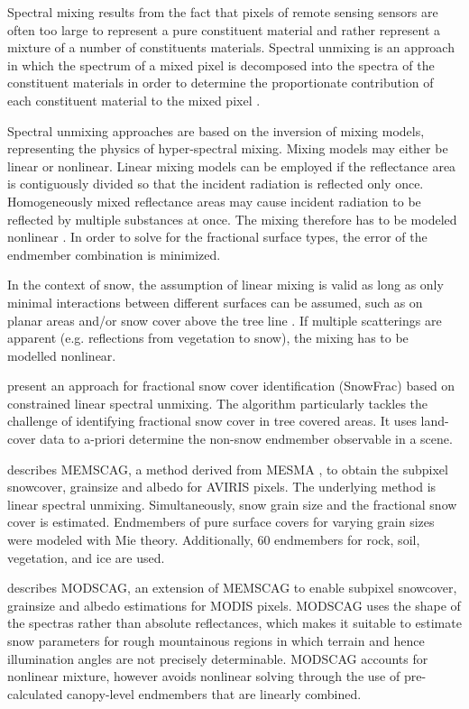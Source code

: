 \documentclass[a4paper,10pt]{article}
\begin{document}
Spectral mixing results from the fact that pixels of remote sensing sensors are often too large to represent a pure constituent material and rather represent a mixture of a number of constituents materials. Spectral unmixing is an approach in which the spectrum of a mixed pixel is decomposed into the spectra of the constituent materials in order to determine the proportionate contribution of each constituent material to the mixed pixel \citep{Keshava2003}.

Spectral unmixing approaches are based on the inversion of mixing models, representing the physics of hyper-spectral mixing. Mixing models may either be linear or nonlinear. Linear mixing models can be employed if the reflectance area is contiguously divided so that the incident radiation is reflected only once. Homogeneously mixed reflectance areas may cause incident radiation to be reflected by multiple substances at once. The mixing therefore has to be modeled nonlinear \citep{Keshava2003}.
In order to solve for the fractional surface types, the error of the endmember combination is minimized.

In the context of snow, the assumption of linear mixing is valid as long as only minimal interactions between different surfaces can be assumed, such as on planar areas and/or snow cover above the tree line \citep{Painter2009}. If multiple scatterings are apparent (e.g. reflections from vegetation to snow), the mixing has to be modelled nonlinear.

\cite{Vikhamar2003} present an approach for fractional snow cover identification (SnowFrac) based on constrained linear spectral unmixing. The algorithm particularly tackles the challenge of identifying fractional snow cover in tree covered areas. It uses land-cover data to a-priori determine the non-snow endmember observable in a scene.

\citep{Painter2003} describes \gls{MEMSCAG}, a method derived from \gls{MESMA} \citep{Roberts1998}, to obtain the subpixel snowcover, grainsize and albedo for \gls{AVIRIS} pixels. The underlying method is linear spectral unmixing. Simultaneously, snow grain size and the fractional snow cover is estimated. Endmembers of pure surface covers for varying grain sizes were modeled with Mie theory. Additionally, 60 endmembers for rock, soil, vegetation, and ice are used.

\Cite{Painter2009} describes \gls{MODSCAG}, an extension of \gls{MEMSCAG} to enable subpixel snowcover, grainsize and albedo estimations for \gls{MODIS} pixels. \gls{MODSCAG} uses the shape of the spectras rather than absolute reflectances, which makes it suitable to estimate snow parameters for rough mountainous regions in which terrain and hence illumination angles are not precisely determinable. \gls{MODSCAG} accounts for nonlinear mixture, however avoids nonlinear solving through the use of pre-calculated canopy-level endmembers that are linearly combined.
\end{document}
